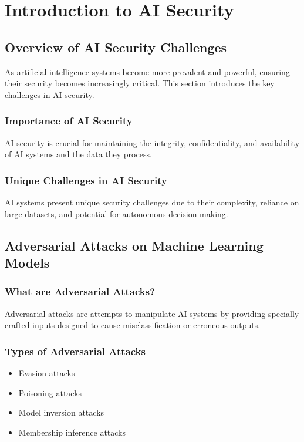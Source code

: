 

\chapter{Introduction to AI Security}

\section{Overview of AI Security Challenges}

As artificial intelligence systems become more prevalent and powerful,
ensuring their security becomes increasingly critical. This section
introduces the key challenges in AI security.

\subsection{Importance of AI Security}

AI security is crucial for maintaining the integrity, confidentiality,
and availability of AI systems and the data they process.

\subsection{Unique Challenges in AI Security}

AI systems present unique security challenges due to their complexity,
reliance on large datasets, and potential for autonomous
decision-making.

\section{Adversarial Attacks on Machine Learning Models}

\subsection{What are Adversarial Attacks?}

Adversarial attacks are attempts to manipulate AI systems by providing
specially crafted inputs designed to cause misclassification or
erroneous outputs.

\subsection{Types of Adversarial Attacks}
\begin{itemize}
    \item Evasion attacks
    \item Poisoning attacks
    \item Model inversion attacks
    \item Membership inference attacks
\end{itemize}


